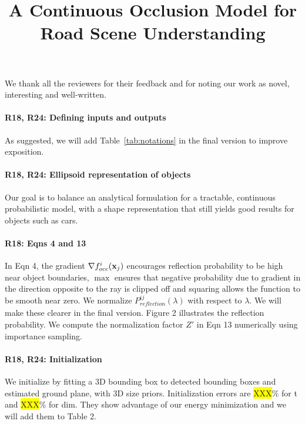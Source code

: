 \documentclass[10pt,twocolumn,letterpaper]{article}
\newcommand{\hili}[1]{\colorbox{yellow}{#1}}
\begin{document}
\title{A Continuous Occlusion Model for Road Scene Understanding}  %

\maketitle
\thispagestyle{empty}

We thank all the reviewers for their feedback and for noting our work as novel, interesting and well-written.

\vspace{-0.4cm}
\paragraph{R18, R24: Defining inputs and outputs} As suggested, we will add Table~\ref{tab:notations} in the final version to improve exposition.

\vspace{-0.4cm}
\paragraph{R18, R24: Ellipsoid representation of objects} Our goal is to balance an analytical formulation for a tractable, continuous probabilistic model, with a shape representation that still yields good results for objects such as cars.

\vspace{-0.4cm}
\paragraph{R18: Eqns 4 and 13}
In Eqn 4, the gradient $\nabla {f^i_{occ}}(\mathbf{x}_j)$ encourages reflection probability to be high near object boundaries, $\max$ ensures that negative probability due to gradient in the direction opposite to the ray is clipped off and squaring allows the function to be smooth near zero. We normalize $P^{ij}_{\textit{reflection}}(\lambda)$  with respect to $\lambda$. We will make these clearer in the final version. Figure 2 illustrates the reflection probability. We compute the normalization factor $Z'$ in Eqn 13 numerically using importance sampling.

\vspace{-0.4cm}
\paragraph{R18, R24: Initialization}
We initialize by fitting a 3D bounding box to detected bounding boxes and estimated ground plane, with 3D size priors. Initialization errors are \hili{XXX}\% for t and \hili{XXX}\% for dim. They show advantage of our energy minimization and we will add them to Table 2.
\end{document}
